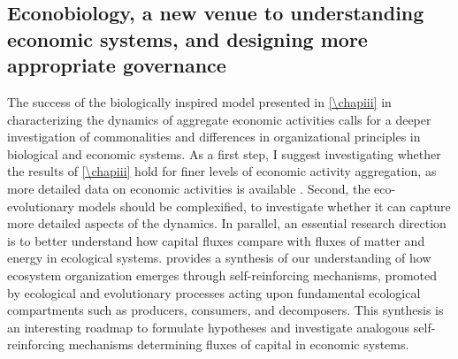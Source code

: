 

\subsection{Econobiology, a new venue to understanding economic systems, and designing more appropriate governance}

The success of the biologically inspired model presented in \cref{\chapiii}  in characterizing the dynamics of aggregate economic activities calls for a deeper investigation of commonalities and differences in organizational principles in biological and economic systems.
% 
% 
% 
% 
As a first step, I suggest investigating whether the results of \cref{\chapiii} hold for finer levels of economic activity aggregation, as more detailed data on economic activities is available \citep{Hausmann2011}. 
% 
Second, the eco-evolutionary models should be complexified, to investigate whether it can capture more detailed aspects of the dynamics.
% 
In parallel, an essential research direction is to better understand how capital fluxes \citep{King1993} compare with fluxes of matter and energy \citep{Veldhuis2018} in ecological systems.
% 
\cite{Veldhuis2018} provides a synthesis of our understanding of how ecosystem organization emerges through self-reinforcing mechanisms, promoted by ecological and evolutionary processes acting upon fundamental ecological compartments such as producers, consumers, and decomposers. This synthesis is an interesting roadmap to formulate hypotheses and investigate analogous self-reinforcing mechanisms determining fluxes of capital in economic systems. 

